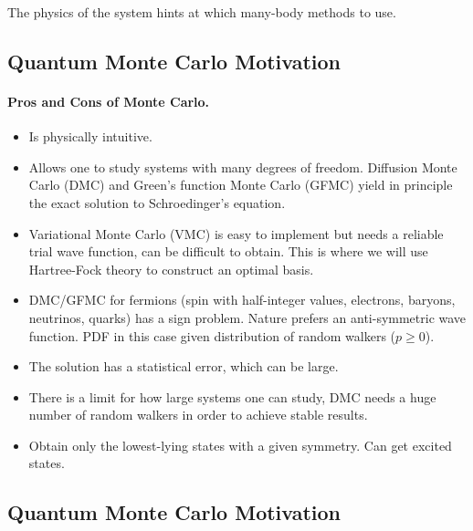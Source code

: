 \documentclass[%
twoside,                 %
final,                   %
10pt]{article}
\begin{document}
\noindent
The physics of the system hints at which many-body methods to use.





\subsection{Quantum Monte Carlo Motivation}

\paragraph{Pros and Cons of Monte Carlo.}
\begin{itemize}
\item Is physically intuitive.

\item Allows one to study systems with many degrees of freedom. Diffusion Monte Carlo (DMC) and Green's function Monte Carlo (GFMC) yield in principle the exact solution to Schroedinger's equation.

\item Variational Monte Carlo (VMC) is easy  to implement but needs a reliable trial wave function, can be difficult to obtain.  This is where we will use Hartree-Fock theory to construct an optimal basis.

\item DMC/GFMC for fermions (spin with half-integer values, electrons, baryons, neutrinos, quarks)  has a sign problem. Nature prefers an anti-symmetric wave function. PDF in this case given distribution of random walkers ($p\ge 0$).

\item The solution has a statistical error, which can be large. 

\item There is a limit for how large systems one can study, DMC needs a huge number of random walkers in order to achieve stable results. 

\item Obtain only the lowest-lying states with a given symmetry. Can get excited states.
\end{itemize}

\noindent





\subsection{Quantum Monte Carlo Motivation}
\end{document}
